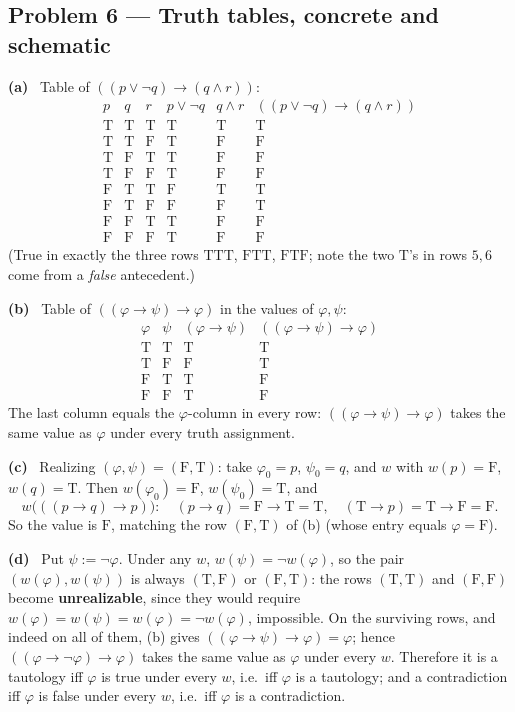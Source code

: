 \documentclass[11pt]{article}
\newcommand{\T}{\mathrm{T}}
\newcommand{\F}{\mathrm{F}}
\newcommand{\solpart}[1]{\smallskip\noindent\textbf{(#1)}\ }
\newcommand{\prob}[2]{\subsection*{Problem #1 --- #2}}
\begin{document}
\prob{6}{Truth tables, concrete and schematic}

\solpart{a} Table of $((p\lor\lnot q)\to(q\land r))$:
\[
\begin{array}{ccc|c|c|c}
p&q&r& p\lor\lnot q & q\land r & ((p\lor\lnot q)\to(q\land r))\\\hline
\T&\T&\T& \T&\T&\T\\
\T&\T&\F& \T&\F&\F\\
\T&\F&\T& \T&\F&\F\\
\T&\F&\F& \T&\F&\F\\
\F&\T&\T& \F&\T&\T\\
\F&\T&\F& \F&\F&\T\\
\F&\F&\T& \T&\F&\F\\
\F&\F&\F& \T&\F&\F
\end{array}
\]
(True in exactly the three rows $\T\T\T$, $\F\T\T$, $\F\T\F$; note the two
$\T$'s in rows $5,6$ come from a \emph{false} antecedent.)

\solpart{b} Table of $((\varphi\to\psi)\to\varphi)$ in the values of $\varphi,\psi$:
\[
\begin{array}{cc|c|c}
\varphi&\psi& (\varphi\to\psi) & ((\varphi\to\psi)\to\varphi)\\\hline
\T&\T& \T&\T\\
\T&\F& \F&\T\\
\F&\T& \T&\F\\
\F&\F& \T&\F
\end{array}
\]
The last column equals the $\varphi$-column in every row: $((\varphi\to\psi)\to
\varphi)$ takes the same value as $\varphi$ under every truth assignment.

\solpart{c} Realizing $(\varphi,\psi)=(\F,\T)$: take $\varphi_0=p$, $\psi_0=q$, and
$w$ with $w(p)=\F$, $w(q)=\T$. Then $w(\varphi_0)=\F$, $w(\psi_0)=\T$, and
\[
w\big(((p\to q)\to p)\big):\quad (p\to q)=\F\to\T=\T,\quad (\T\to p)=\T\to\F=\F.
\]
So the value is $\F$, matching the row $(\F,\T)$ of (b) (whose entry equals
$\varphi=\F$).

\solpart{d} Put $\psi:=\lnot\varphi$. Under any $w$, $w(\psi)=\lnot w(\varphi)$, so
the pair $(w(\varphi),w(\psi))$ is always $(\T,\F)$ or $(\F,\T)$: the rows $(\T,\T)$
and $(\F,\F)$ become \textbf{unrealizable}, since they would require $w(\varphi)=
w(\psi)=w(\varphi)=\lnot w(\varphi)$, impossible. On the surviving rows, and indeed
on all of them, (b) gives $((\varphi\to\psi)\to\varphi)=\varphi$; hence
$((\varphi\to\lnot\varphi)\to\varphi)$ takes the same value as $\varphi$ under every
$w$. Therefore it is a tautology iff $\varphi$ is true under every $w$, i.e.\ iff
$\varphi$ is a tautology; and a contradiction iff $\varphi$ is false under every
$w$, i.e.\ iff $\varphi$ is a contradiction.
\end{document}
